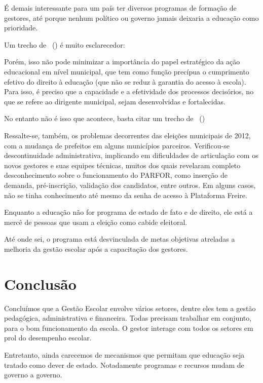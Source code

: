 \documentclass[
	12pt,				%
	openright,			%
	oneside,
	a4paper,			%
	chapter=TITLE,		%
	section=TITLE,		%
	sumario=abnt-6027-2012,
	english,			%
	brazil				%
]{abntex2}
\newcommand{\citeaa}[1]{\citeauthoronline{#1}~(\citeyear{#1})}
\begin{document}
		É demais interessante para um país ter diversos programas de formação de gestores, até porque nenhum político ou governo jamais deixaria a educação como prioridade.
		
		Um trecho de \citeaa{PRADIME01} é muito esclarecedor:
		
		\begin{citacao}
			Porém, isso não pode minimizar a importância do papel estratégico da ação educacional em nível municipal, que tem como função precípua o cumprimento efetivo do direito à educação (que não se reduz à garantia do acesso à escola). Para isso, é preciso que a capacidade e a efetividade dos processos decisórios, no que se refere ao dirigente municipal, sejam desenvolvidas e fortalecidas.
		\end{citacao}
		
		No entanto não é isso que acontece, basta citar um trecho de \citeaa{Glap2017}
		
		\begin{citacao}
			Ressalte-se, também, os problemas decorrentes das eleições municipais de
			2012, com a mudança de prefeitos em alguns municípios parceiros. Verificou-se
			descontinuidade administrativa, implicando em dificuldades de articulação com os
			novos gestores e suas equipes técnicas, muitos dos quais revelaram completo
			desconhecimento sobre o funcionamento do PARFOR, como inserção de demanda,
			pré-inscrição, validação dos candidatos, entre outros. Em alguns casos, não se tinha
			conhecimento até mesmo da senha de acesso à Plataforma Freire.
		\end{citacao}
	
		Enquanto a educação não for programa de estado de fato e de direito, ele está a mercê de pessoas que usam a eleição como cabide eleitoral.
		
		Até onde sei, o programa está desvinculada de metas objetivas atreladas a melhoria da gestão escolar após a capacitação dos gestores. 
		

	\section{Conclusão}		
		Concluímos  que  a  Gestão  Escolar  envolve  vários  setores,  dentre  eles  tem  a  gestão pedagógica,  administrativa  e  financeira. Todas  precisam  trabalhar  em  conjunto,  para o  bom  funcionamento  da  escola.  O  gestor  interage  com  todos  os setores  em  prol  do desempenho escolar.
		
		Entretanto, ainda carecemos de mecanismos que permitam que educação seja tratado como dever de estado. Notadamente programas e recursos mudam de governo a governo.
		
\end{document}
